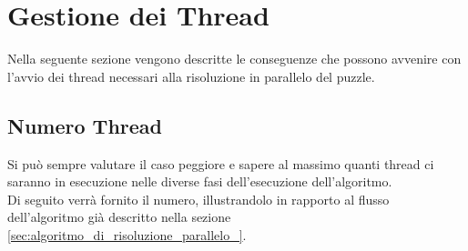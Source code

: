 % 
%
%

\section{Gestione dei Thread} %
\label{sec:gestione_dei_thread}
Nella seguente sezione vengono descritte le conseguenze che possono avvenire con l'avvio dei thread necessari alla risoluzione in parallelo del puzzle.

	\subsection{Numero Thread} %
	\label{sub:numero_thread}
	Si può sempre valutare il caso peggiore e sapere al massimo quanti thread ci saranno in esecuzione nelle diverse fasi dell'esecuzione dell'algoritmo. \\
	Di seguito verrà fornito il numero, illustrandolo in rapporto al flusso dell'algoritmo già descritto nella sezione \ref{sec:algoritmo_di_risoluzione_parallelo_}.
